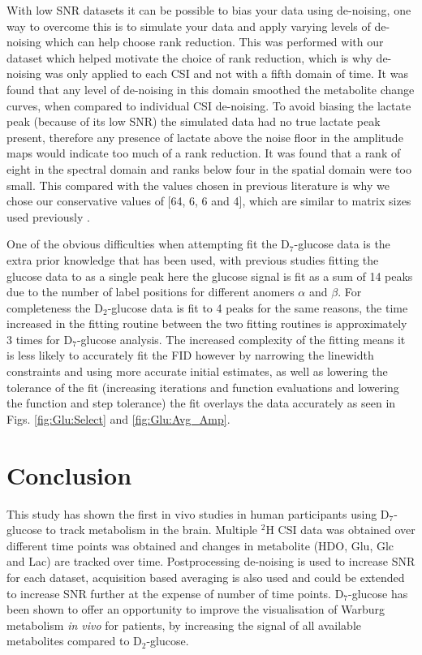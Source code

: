 With low \ac{SNR} datasets it can be possible to bias your data using de-noising, one way to overcome this is to simulate your data and apply varying levels of de-noising which can help choose rank reduction. This was performed with our dataset which helped motivate the choice of rank reduction, which is why de-noising was only applied to each \ac{CSI} and not with a fifth domain of time. It was found that any level of de-noising in this domain smoothed the metabolite change curves, when compared to individual \ac{CSI} de-noising. To avoid biasing the lactate peak (because of its low \ac{SNR}) the simulated data had no true lactate peak present, therefore any presence of lactate above the noise floor in the amplitude maps would indicate too much of a rank reduction. It was found that a rank of eight in the spectral domain and ranks below four in the spatial domain were too small. This compared with the values chosen in previous literature is why we chose our conservative values of [64, 6, 6 and 4], which are similar to matrix sizes used previously \cite{vonMorze2021ComparisonT, Kreis2020MeasuringMRI}. 

One of the obvious difficulties when attempting fit the D$_7$-glucose data is the extra prior knowledge that has been used, with previous studies fitting the glucose data to as a single peak here the glucose signal is fit as a sum of 14 peaks due to the number of label positions for different anomers $\alpha$ and $\beta$. For completeness the D$_2$-glucose data is fit to 4 peaks for the same reasons, the time increased in the fitting routine between the two fitting routines is approximately 3 times for D$_7$-glucose analysis. The increased complexity of the fitting means it is less likely to accurately fit the \ac{FID} however by narrowing the linewidth constraints and using more accurate initial estimates, as well as lowering the tolerance of the fit (increasing iterations and function evaluations and lowering the function and step tolerance) the fit overlays the data accurately as seen in Figs. \ref{fig:Glu:Select} and \ref{fig:Glu:Avg_Amp}. 

\section{Conclusion}

This study has shown the first in vivo studies in human participants using D$_7$-glucose to track metabolism in the brain. Multiple $^2$H \ac{CSI} data was obtained over different time points was obtained and changes in metabolite (\ac{HDO}, Glu, Glc and Lac) are tracked over time. Postprocessing de-noising is used to increase \ac{SNR} for each dataset, acquisition based averaging is also used and could be extended to increase \ac{SNR} further at the expense of number of time points. D$_7$-glucose has been shown to offer an opportunity to improve the visualisation of Warburg metabolism \textit{in vivo} for patients, by increasing the signal of all available metabolites compared to D$_2$-glucose. 
